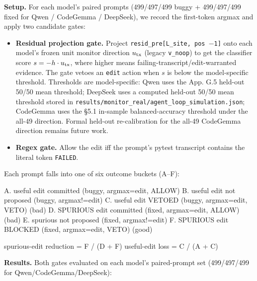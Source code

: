 \documentclass[
  11pt,
  a4paper]{article}
\providecommand{\tightlist}{%
  \setlength{\itemsep}{0pt}\setlength{\parskip}{0pt}}
\begin{document}
\textbf{Setup.} For each model's paired prompts (499/497/499 buggy +
499/497/499 fixed for Qwen / CodeGemma / DeepSeek), we record the
first-token argmax and apply two candidate gates:

\begin{itemize}
\tightlist
\item
  \textbf{Residual projection gate.} Project
  \texttt{resid\_pre{[}L\_site,\ pos\ \ensuremath{-}1{]}} onto each model's frozen
  unit monitor direction \(u_{\rm tx}\) (legacy \texttt{v\_noop}) to get
  the classifier score \(s=-h\cdot u_{\rm tx}\), where higher means
  failing-transcript/edit-warranted evidence. The gate vetoes an
  \texttt{edit} action when \(s\) is below the model-specific threshold.
  Thresholds are model-specific: Qwen uses the App. G.5 held-out 50/50
  mean threshold; DeepSeek uses a computed held-out 50/50 mean threshold
  stored in \texttt{results/monitor\_real/agent\_loop\_simulation.json};
  CodeGemma uses the \S{}5.1 in-sample balanced-accuracy threshold under
  the all-49 direction. Formal held-out re-calibration for the all-49
  CodeGemma direction remains future work.
\item
  \textbf{Regex gate.} Allow the edit iff the prompt's pytest transcript
  contains the literal token \texttt{FAILED}.
\end{itemize}

Each prompt falls into one of six outcome buckets (A--F):

A. useful edit committed (buggy, argmax=edit, ALLOW) B. useful edit not
proposed (buggy, argmax!=edit) C. useful edit VETOED (buggy,
argmax=edit, VETO) (bad) D. SPURIOUS edit committed (fixed, argmax=edit,
ALLOW) (bad) E. spurious not proposed (fixed, argmax!=edit) F. SPURIOUS
edit BLOCKED (fixed, argmax=edit, VETO) (good)

spurious-edit reduction = F / (D + F) useful-edit loss = C / (A + C)

\textbf{Results.} Both gates evaluated on each model's paired-prompt set
(499/497/499 for Qwen/CodeGemma/DeepSeek):
\end{document}
